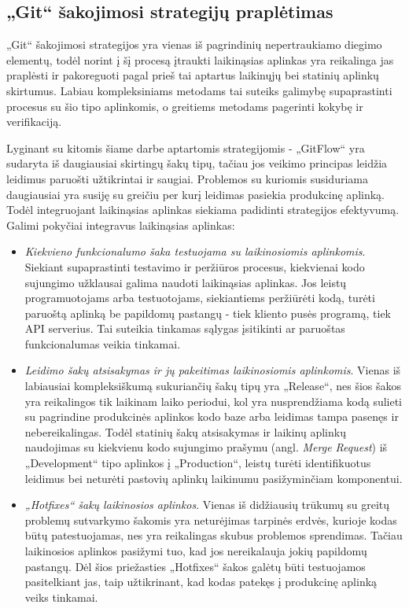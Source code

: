 \documentclass{VUMIFPSkursinis}
\begin{document}
\subsection{„Git“ šakojimosi strategijų praplėtimas}

„Git“ šakojimosi strategijos yra vienas iš pagrindinių nepertraukiamo diegimo elementų, todėl norint į šį procesą įtraukti laikinąsias aplinkas yra reikalinga jas praplėsti ir pakoreguoti pagal prieš tai aptartus laikinųjų bei statinių aplinkų skirtumus. Labiau kompleksiniams metodams tai suteiks galimybę supaprastinti procesus su šio tipo aplinkomis, o greitiems metodams pagerinti kokybę ir verifikaciją. 

Lyginant su kitomis šiame darbe aptartomis strategijomis - „GitFlow“ yra sudaryta iš daugiausiai skirtingų šakų tipų, tačiau jos veikimo principas leidžia leidimus paruošti užtikrintai ir saugiai. Problemos su kuriomis susiduriama daugiausiai yra susiję su greičiu per kurį leidimas pasiekia produkcinę aplinką. Todėl integruojant laikinąsias aplinkas siekiama padidinti strategijos efektyvumą. Galimi pokyčiai integravus laikinąsias aplinkas: 

\begin{itemize}
  \item \textit{Kiekvieno funkcionalumo šaka testuojama su laikinosiomis aplinkomis}. Siekiant supaprastinti testavimo ir peržiūros procesus, kiekvienai kodo sujungimo užklausai galima naudoti laikinąsias aplinkas. Jos leistų programuotojams arba testuotojams, siekiantiems peržiūrėti kodą, turėti paruoštą aplinką be papildomų pastangų - tiek kliento pusės programą, tiek API serverius. Tai suteikia tinkamas sąlygas įsitikinti ar paruoštas funkcionalumas veikia tinkamai.

  \item \textit{Leidimo šakų atsisakymas ir jų pakeitimas laikinosiomis aplinkomis}. Vienas iš labiausiai kompleksiškumą sukuriančių šakų tipų yra „Release“, nes šios šakos yra reikalingos tik laikinam laiko periodui, kol yra nusprendžiama kodą sulieti su pagrindine produkcinės aplinkos kodo baze arba leidimas tampa pasenęs ir nebereikalingas. Todėl statinių šakų atsisakymas ir laikinų aplinkų naudojimas su kiekvienu kodo sujungimo prašymu (angl. \textit{Merge Request}) iš „Development“ tipo aplinkos į „Production“, leistų turėti identifikuotus leidimus bei neturėti pastovių aplinkų laikinumu pasižyminčiam komponentui.
  
  \item \textit{„Hotfixes“ šakų laikinosios aplinkos}. Vienas iš didžiausių trūkumų su greitų problemų sutvarkymo šakomis yra neturėjimas tarpinės erdvės, kurioje kodas būtų patestuojamas, nes yra reikalingas skubus problemos sprendimas. Tačiau laikinosios aplinkos pasižymi tuo, kad jos nereikalauja jokių papildomų pastangų. Dėl šios priežasties „Hotfixes“ šakos galėtų būti testuojamos pasitelkiant jas, taip užtikrinant, kad kodas patekęs į produkcinę aplinką veiks tinkamai.

\end{itemize}
\end{document}
